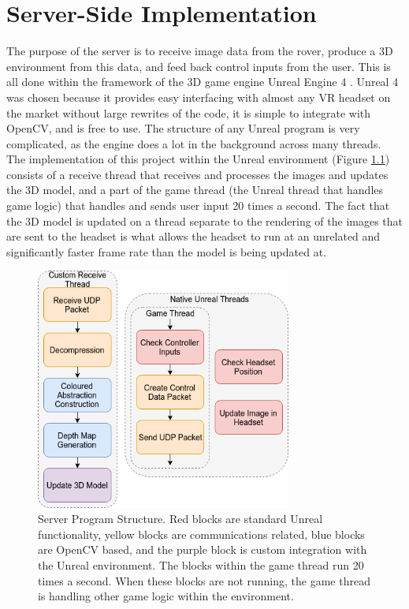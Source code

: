 \chapter{Server-Side Implementation}
\label{chapter:server}

The purpose of the server is to receive image data from the rover, produce a 3D environment from this data, and feed back control inputs from the user. This is all done within the framework of the 3D game engine Unreal Engine 4 \cite{unreal}. Unreal 4 was chosen because it provides easy interfacing with almost any VR headset on the market without large rewrites of the code, it is simple to integrate with OpenCV, and is free to use. The structure of any Unreal program is very complicated, as the engine does a lot in the background across many threads. The implementation of this project within the Unreal environment (Figure \ref{fig:unreal}) consists of a receive thread that receives and processes the images and updates the 3D model, and a part of the game thread (the Unreal thread that handles game logic) that handles and sends user input 20 times a second. The fact that the 3D model is updated on a thread separate to the rendering of the images that are sent to the headset is what allows the headset to run at an unrelated and significantly faster frame rate than the model is being updated at.

\begin{figure}[H]
    \begin{center}
      \includegraphics[width=0.75\textwidth]{Figures/Unreal.png}
      \caption[Server Program Structure]{Server Program Structure. Red blocks are standard Unreal functionality, yellow blocks are communications related, blue blocks are OpenCV based, and the purple block is custom integration with the Unreal environment. The blocks within the game thread run 20 times a second. When these blocks are not running, the game thread is handling other game logic within the environment.}
      \label{fig:unreal}
    \end{center}
\end{figure}

